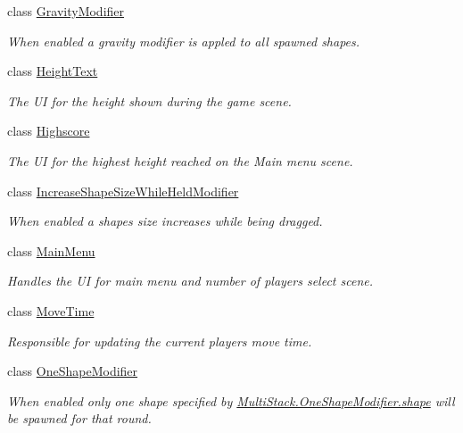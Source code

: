 \begin{DoxyCompactItemize}
class \hyperlink{class_multi_stack_1_1_gravity_modifier}{Gravity\+Modifier}
\begin{DoxyCompactList}\small\item\em When enabled a gravity modifier is appled to all spawned shapes. \end{DoxyCompactList}\item 
class \hyperlink{class_multi_stack_1_1_height_text}{Height\+Text}
\begin{DoxyCompactList}\small\item\em The U\+I for the height shown during the game scene. \end{DoxyCompactList}\item 
class \hyperlink{class_multi_stack_1_1_highscore}{Highscore}
\begin{DoxyCompactList}\small\item\em The U\+I for the highest height reached on the Main menu scene. \end{DoxyCompactList}\item 
class \hyperlink{class_multi_stack_1_1_increase_shape_size_while_held_modifier}{Increase\+Shape\+Size\+While\+Held\+Modifier}
\begin{DoxyCompactList}\small\item\em When enabled a shapes size increases while being dragged. \end{DoxyCompactList}\item 
class \hyperlink{class_multi_stack_1_1_main_menu}{Main\+Menu}
\begin{DoxyCompactList}\small\item\em Handles the U\+I for main menu and number of players select scene. \end{DoxyCompactList}\item 
class \hyperlink{class_multi_stack_1_1_move_time}{Move\+Time}
\begin{DoxyCompactList}\small\item\em Responsible for updating the current players move time. \end{DoxyCompactList}\item 
class \hyperlink{class_multi_stack_1_1_one_shape_modifier}{One\+Shape\+Modifier}
\begin{DoxyCompactList}\small\item\em When enabled only one shape specified by \hyperlink{class_multi_stack_1_1_one_shape_modifier_a5724e9f0dc3edb5f97363252a67b5db5}{Multi\+Stack.\+One\+Shape\+Modifier.\+shape} will be spawned for that round. \end{DoxyCompactList}\item 

\end{DoxyCompactItemize}
